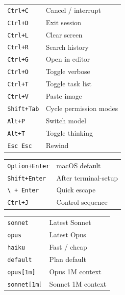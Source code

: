 \documentclass[10pt]{extarticle}
\begin{document}
\begin{multicols}{2}
\begin{tabularx}{\linewidth}{@{}l@{\enspace}Y@{}}
\texttt{Ctrl+C}                      & Cancel / interrupt \\
\texttt{Ctrl+D}                      & Exit session \\
\texttt{Ctrl+L}                      & Clear screen \\
\texttt{Ctrl+R}                      & Search history \\
\texttt{Ctrl+G}                      & Open in editor \\
\texttt{Ctrl+O}                      & Toggle verbose \\
\texttt{Ctrl+T}                      & Toggle task list \\
\texttt{Ctrl+V}                      & Paste image \\
\texttt{Shift+Tab}                   & Cycle permission modes \\
\texttt{Alt+P}                       & Switch model \\
\texttt{Alt+T}                       & Toggle thinking \\
\texttt{Esc Esc}                     & Rewind \\
\end{tabularx}

\begin{tabularx}{\linewidth}{@{}l@{\enspace}Y@{}}
\texttt{Option+Enter}               & macOS default \\
\texttt{Shift+Enter}                & After terminal-setup \\
\texttt{\textbackslash{} + Enter}   & Quick escape \\
\texttt{Ctrl+J}                      & Control sequence \\
\end{tabularx}

\begin{tabularx}{\linewidth}{@{}l@{\enspace}Y@{}}
\texttt{sonnet}                      & Latest Sonnet \\
\texttt{opus}                        & Latest Opus \\
\texttt{haiku}                       & Fast / cheap \\
\texttt{default}                     & Plan default \\
\texttt{opus[1m]}                    & Opus 1M context \\
\texttt{sonnet[1m]}                  & Sonnet 1M context \\
\end{tabularx}

\end{multicols}
\end{document}
